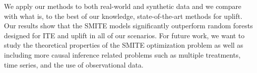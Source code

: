 \documentclass{article}
\begin{document}
We apply our methods to both real-world and synthetic data and we compare with what is, to the best of our knowledge, state-of-the-art methods for uplift. Our results show that the SMITE models significantly outperform random forests designed for ITE and uplift in all of our scenarios. For future work, we want to study the theoretical properties of the SMITE optimization problem as well as including more causal inference related problems such as multiple treatments, time series, and the use of observational data.



\end{document}
